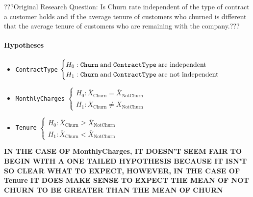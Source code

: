 \documentclass[man, floatsintext]{apa6}
\begin{document}
???Original Research Question:
Is Churn rate independent of the type of contract a customer holds and if the average tenure of customers who churned is different that the average tenure of customers who are remaining with the company.???

\paragraph{Hypotheses}

\begin{itemize}
\item \texttt{ContractType} $\begin{cases}
H_0: \texttt{Churn} \hspace{1mm} \text{and}  \hspace{1mm} \texttt{ContractType} \hspace{1mm} \text{are independent} \\
H_1: \texttt{Churn} \hspace{1mm} \text{and} \hspace{1mm} \texttt{ContractType} \hspace{1mm} \text{are not independent}
\end{cases}$
\item \texttt{MonthlyCharges} $\begin{cases}
H_0: \overline{X}_{\text{Churn}} = \overline{X}_{\text{NotChurn}} \\
H_1: \overline{X}_{\text{Churn}} \neq \overline{X}_{\text{NotChurn}}
\end{cases}$ 
\item \texttt{Tenure} $\begin{cases}
H_0: \overline{X}_{\text{Churn}} \geq \overline{X}_{\text{NotChurn}} \\
H_1: \overline{X}_{\text{Churn}} < \overline{X}_{\text{NotChurn}}
\end{cases}$ 
\end{itemize}

\textbf{IN THE CASE OF MonthlyCharges, IT DOESN'T SEEM FAIR TO BEGIN WITH A ONE TAILED HYPOTHESIS BECAUSE IT ISN'T SO CLEAR WHAT TO EXPECT, HOWEVER, IN THE CASE OF Tenure IT DOES MAKE SENSE TO EXPECT THE MEAN OF NOT CHURN TO BE GREATER THAN THE MEAN OF CHURN}


\end{document}
